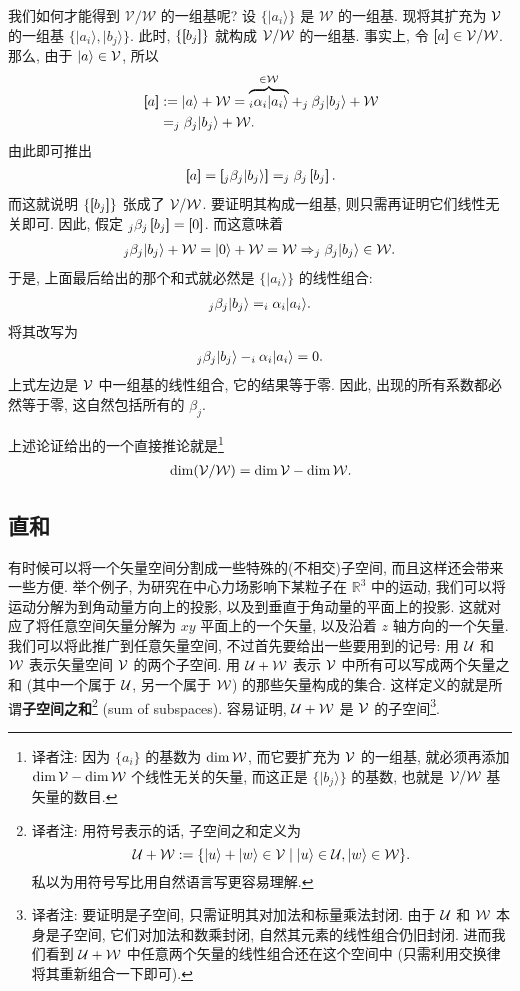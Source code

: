 \documentclass[lang=cn,zihao=-4,twoside,fontset=none]{textbook}
\let\sum\relax
\newcommand{\equivclass}[1]{\left[\hspace{-3pt}\left[#1\right]\hspace{-2.5pt}\right]}
\def\EQ#1{\begin{equation}\begin{aligned}{}#1\end{aligned}\end{equation}}
\def\eq#1{\[\begin{aligned}{}#1\end{aligned}\]}
\renewcommand{\ket}[1]{| #1 \rangle}
\begin{document}
我们如何才能得到 $\mathcal V/\mathcal{W}$ 的一组基呢? 设 $\{\ket{a_i}\}$ 是 $\mathcal{W}$ 的一组基. 现将其扩充为 ${\mathcal V}$ 的一组基 $\{\ket{a_i},\ket{b_j}\}$. 此时, $\{\equivclass{b_j}\}$ 就构成 ${\mathcal V}/{\mathcal W}$ 的一组基. 事实上, 令 $\equivclass{a}\in\mV/\mW$. 那么, 由于 $\ket{a}\in\mV$, 所以
\eq{
    \equivclass{a}&:= \ket{a} + \mW = \overset{\in\mW}{\overbrace{\sum_i\alpha_i\ket{a_i}}} + \sum_j\beta_j\ket{b_j}+\mW \\
    &=\sum_j\beta_j\ket{b_j} + \mW.    }
由此即可推出 
\eq{
    \equivclass{a}=\equivclass{\sum_j\beta_j\ket{b_j}}=\sum_j\beta_j\equivclass{b_j}.
}
而这就说明 $\{\equivclass{b_j}\}$ 张成了 ${\mathcal V}/{\mathcal W}$. 要证明其构成一组基, 则只需再证明它们线性无关即可. 因此, 假定 $\sum_j\beta_j\equivclass{b_j}=\equivclass{0}$. 而这意味着
\eq{
    \sum_j\beta_j\ket{b_j} + \mW = \ket{0} + \mW = \mW \Rightarrow \sum_j \beta_j \ket{b_j} \in \mW.
}
于是, 上面最后给出的那个和式就必然是 $\{\ket{a_i}\}$ 的线性组合:
\eq{
    \sum_j\beta_j\ket{b_j} = \sum_i\alpha_i \ket{a_i}.
}
将其改写为 
\eq{
    \sum_j\beta_j\ket{b_j} - \sum_i \alpha_i \ket{a_i}= 0.
}
上式左边是 ${\mathcal V}$ 中一组基的线性组合, 它的结果等于零. 因此, 出现的所有系数都必然等于零, 这自然包括所有的 $\beta_j$.

上述论证给出的一个直接推论就是\footnote{译者注: 因为 $\{a_i\}$ 的基数为 $\dim{\mathcal W}$, 而它要扩充为 ${\mathcal V}$ 的一组基, 就必须再添加 $\dim{\mathcal V} - \dim{\mathcal W}$ 个线性无关的矢量, 而这正是 $\{\ket{b_j}\}$ 的基数, 也就是 ${\mathcal V}/{\mathcal W}$ 基矢量的数目.}
\EQ{
    \dim(\mV/\mW) = \dim\mV - \dim\mW. \label{eq:2.2}
}

\newpage
\subsection{直和} \label{sec:2.1.3}

有时候可以将一个矢量空间分割成一些特殊的(不相交)子空间, 而且这样还会带来一些方便. 举个例子, 为研究在中心力场影响下某粒子在 $\mathbb R^3$ 中的运动, 我们可以将运动分解为到角动量方向上的投影, 以及到垂直于角动量的平面上的投影. 这就对应了将任意空间矢量分解为 $xy$ 平面上的一个矢量, 以及沿着 $z$ 轴方向的一个矢量. 我们可以将此推广到任意矢量空间, 不过首先要给出一些要用到的记号: 用 ${\mathcal U}$ 和 ${\mathcal W}$ 表示矢量空间 ${\mathcal V}$ 的两个子空间. 用 ${\mathcal U}+{\mathcal W}$ 表示 ${\mathcal V}$ 中所有可以写成两个矢量之和 (其中一个属于 ${\mathcal U}$, 另一个属于 ${\mathcal W}$) 的那些矢量构成的集合. 这样定义的就是所谓\textbf{子空间之和}\footnote{译者注: 用符号表示的话, 子空间之和定义为\[\mU+\mW:=\{\ket{u}+\ket{w}\in\mathcal V\mid \ket{u}\in\mU,\ket{w}\in\mW\}.\] 私以为用符号写比用自然语言写更容易理解.} (sum of subspaces). 容易证明, ${\mathcal U}+{\mathcal W}$ 是 ${\mathcal V}$ 的子空间\footnote{译者注: 要证明是子空间, 只需证明其对加法和标量乘法封闭. 由于 ${\mathcal U}$ 和 ${\mathcal W}$ 本身是子空间, 它们对加法和数乘封闭, 自然其元素的线性组合仍旧封闭. 进而我们看到 ${\mathcal U}+{\mathcal W}$ 中任意两个矢量的线性组合还在这个空间中 (只需利用交换律将其重新组合一下即可).}. 
\end{document}
